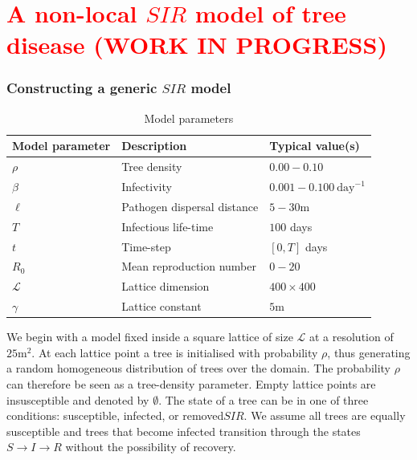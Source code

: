 \chapter{\textcolor{red}{A non-local $SIR$ model of tree disease (WORK IN PROGRESS)}}

\blindtext

\blindtext

\subsection{Constructing a generic $SIR$ model} %
\label{section:sgm-expo}
\begin{table}[h]
\centering
\begin{tabular}{l l l}
\hline
\textbf{Model parameter} & \textbf{Description} & \textbf{Typical value(s)}\\
\hline
$\rho$  & Tree density & $0.00 - 0.10$ \\ 
$\beta$ & Infectivity & $0.001 - 0.100\ \mathrm{day}^{-1}$ \\
$\ell$ & Pathogen dispersal distance & $5-30\mathrm{m}$ \\
$T$ & Infectious life-time & $100$ days \\
$t$ & Time-step & $[0, T]$ days\\
$R_0$ & Mean reproduction number & $0-20$ \\
$\mathcal{L}$ & Lattice dimension & $400\times400$ \\
$\gamma$ & Lattice constant & $5\mathrm{m}$ \\
\hline
\end{tabular}
\caption{Model parameters}
\end{table}

We begin with a model fixed inside a square lattice of size $\mathcal{L}$ at a resolution of $\mathrm{25m^2}$. At each lattice point a tree is initialised with probability $\rho$, thus generating a random homogeneous distribution of trees over the domain. The probability $\rho$ can therefore be seen as a tree-density parameter. Empty lattice points are insusceptible and denoted by $\emptyset$. The state of a tree can be in one of three conditions: susceptible, infected, or removed\textemdash $SIR$. We assume all trees are equally susceptible and trees that become infected transition through the states $S\rightarrow I\rightarrow R$ without the possibility of recovery.

